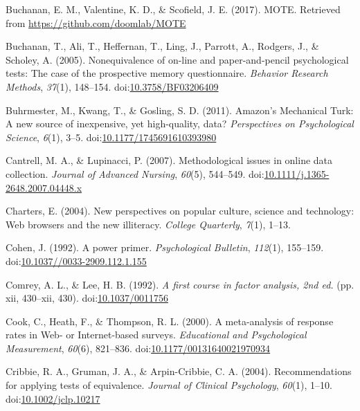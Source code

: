 \documentclass[english,man, mask]{apa6}
\theoremstyle{definition}
\theoremstyle{definition}
\theoremstyle{definition}
\theoremstyle{remark}
\begin{document}
\hypertarget{ref-Buchanan2017}{}
Buchanan, E. M., Valentine, K. D., \& Scofield, J. E. (2017). MOTE.
Retrieved from \url{https://github.com/doomlab/MOTE}

\hypertarget{ref-Buchanan2005}{}
Buchanan, T., Ali, T., Heffernan, T., Ling, J., Parrott, A., Rodgers,
J., \& Scholey, A. (2005). Nonequivalence of on-line and
paper-and-pencil psychological tests: The case of the prospective memory
questionnaire. \emph{Behavior Research Methods}, \emph{37}(1), 148--154.
doi:\href{https://doi.org/10.3758/BF03206409}{10.3758/BF03206409}

\hypertarget{ref-Buhrmester2011}{}
Buhrmester, M., Kwang, T., \& Gosling, S. D. (2011). Amazon's Mechanical
Turk: A new source of inexpensive, yet high-quality, data?
\emph{Perspectives on Psychological Science}, \emph{6}(1), 3--5.
doi:\href{https://doi.org/10.1177/1745691610393980}{10.1177/1745691610393980}

\hypertarget{ref-Cantrell2007}{}
Cantrell, M. A., \& Lupinacci, P. (2007). Methodological issues in
online data collection. \emph{Journal of Advanced Nursing},
\emph{60}(5), 544--549.
doi:\href{https://doi.org/10.1111/j.1365-2648.2007.04448.x}{10.1111/j.1365-2648.2007.04448.x}

\hypertarget{ref-Charters2004}{}
Charters, E. (2004). New perspectives on popular culture, science and
technology: Web browsers and the new illiteracy. \emph{College
Quarterly}, \emph{7}(1), 1--13.

\hypertarget{ref-Cohen1992a}{}
Cohen, J. (1992). A power primer. \emph{Psychological Bulletin},
\emph{112}(1), 155--159.
doi:\href{https://doi.org/10.1037//0033-2909.112.1.155}{10.1037//0033-2909.112.1.155}

\hypertarget{ref-Comrey1992}{}
Comrey, A. L., \& Lee, H. B. (1992). \emph{A first course in factor
analysis, 2nd ed.} (pp. xii, 430--xii, 430).
doi:\href{https://doi.org/10.1037/0011756}{10.1037/0011756}

\hypertarget{ref-Cook2000}{}
Cook, C., Heath, F., \& Thompson, R. L. (2000). A meta-analysis of
response rates in Web- or Internet-based surveys. \emph{Educational and
Psychological Measurement}, \emph{60}(6), 821--836.
doi:\href{https://doi.org/10.1177/00131640021970934}{10.1177/00131640021970934}

\hypertarget{ref-Cribbie2004}{}
Cribbie, R. A., Gruman, J. A., \& Arpin-Cribbie, C. A. (2004).
Recommendations for applying tests of equivalence. \emph{Journal of
Clinical Psychology}, \emph{60}(1), 1--10.
doi:\href{https://doi.org/10.1002/jclp.10217}{10.1002/jclp.10217}
\end{document}
